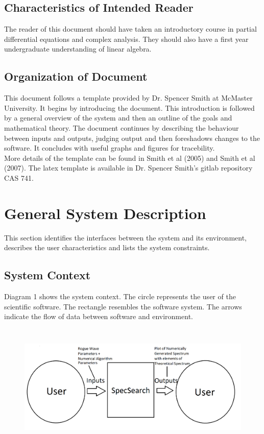\documentclass[12pt]{article}
\begin{document}
\subsection{Characteristics of Intended Reader} 

The reader of this document should have taken an introductory course 
in partial differential equations and complex analysis. They should also have a 
first year undergraduate understanding of linear algebra.\\

\subsection{Organization of Document}

This document follows a template provided by Dr. Spencer Smith at McMaster 
University. It begins by introducing the document. This introduction is 
followed by a general overview of the system and then an outline of the goals 
and mathematical theory. The document continues by describing the behaviour 
between inputs 
and outputs, judging output and then foreshadows changes to the software. It 
concludes with useful graphs and figures for tracebility. \\ 

More details of the template can be found in Smith et al (2005) and Smith et al 
(2007). The latex template is available in Dr. Spencer Smith's gitlab 
repository CAS 741. \\

\section{General System Description}

This section identifies the interfaces between the system and its environment,
describes the user characteristics and lists the system constraints.

\subsection{System Context} 
Diagram 1 shows the system context. The circle represents the user of the 
scientific software. The rectangle resembles the software system. The arrows 
indicate the flow of data between software and environment. 
 \begin{figure}[h!]
	\begin{center}
		{
			\includegraphics[width=15cm,height=6cm]{SystemContext.png}
		}
	\end{center}
 \end{figure}
\end{document}
